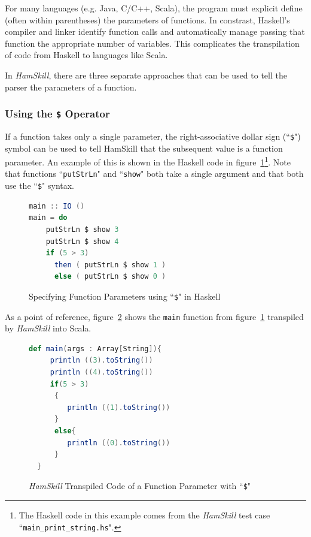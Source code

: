 \documentclass{report}
\begin{document}
For many languages (e.g. Java, C/C++, Scala), the program must explicit define (often within parentheses) the parameters of functions.  In constrast, Haskell's compiler and linker identify function calls and automatically manage passing that function the appropriate number of variables.  This complicates the transpilation of code from Haskell to languages like Scala.

In \textit{HamSkill}, there are three separate approaches that can be used to tell the parser the parameters of a function.

\subsubsection{Using the \texttt{\$} Operator}

If a function takes only a single parameter, the right-associative dollar sign (``\texttt{\$}") symbol can be used to tell HamSkill that the subsequent value is a function parameter.  An example of this is shown in the Haskell code in figure~\ref{fig:useDollarSignHaskell}\footnote{The Haskell code in this example comes from the \textit{HamSkill} test case ``\texttt{main\_print\_string.hs}".}.  Note that functions ``\texttt{putStrLn}" and ``\texttt{show}" both take a single argument and that both use the ``\texttt{\$}" syntax.

\begin{figure}[H]
\begin{mdframed}
\begin{lstlisting}[basicstyle=\small, language=scala]
main :: IO ()
main = do
    putStrLn $ show 3 
    putStrLn $ show 4
    if (5 > 3) 
      then ( putStrLn $ show 1 ) 
      else ( putStrLn $ show 0 )
\end{lstlisting}
\end{mdframed}
\caption{Specifying Function Parameters using ``\texttt{\$}" in Haskell}\label{fig:useDollarSignHaskell}
\end{figure}

As a point of reference, figure~\ref{fig:useDollarSignScala} shows the \texttt{main} function from figure~\ref{fig:useDollarSignHaskell} transpiled by \textit{HamSkill} into Scala.

\begin{figure}[H]
\begin{mdframed}
\begin{lstlisting}[basicstyle=\small, language=scala]
  def main(args : Array[String]){
     println ((3).toString())
     println ((4).toString())
     if(5 > 3)
      {
         println ((1).toString())
      }
      else{
         println ((0).toString())
      }
  } 
\end{lstlisting}
\end{mdframed}
\caption{\textit{HamSkill} Transpiled Code of a Function Parameter with ``\texttt{\$}"}\label{fig:useDollarSignScala}
\end{figure}
\end{document}
